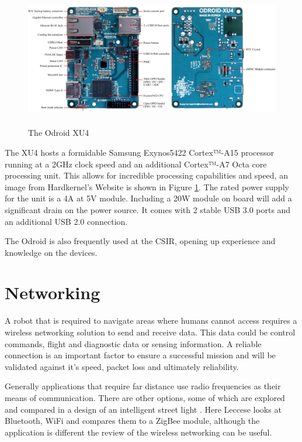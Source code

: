 			\begin{figure}[H]
				\centering
				\includegraphics[height = 6cm]{Images/System/XU4.jpg}     
				\caption{The Odroid XU4}
				\label{IM_Odroid}
			\end{figure}
			
			The XU4 hosts a formidable Samsung Exynos5422 Cortex™-A15 processor running at a 2GHz clock speed and an additional Cortex™-A7 Octa core processing unit. This allows for incredible processing capabilities and speed, an image from Hardkernel's Website is shown in Figure \ref{IM_Odroid}. The rated power supply for the unit is a 4A at 5V module. Including a 20W module on board will add a significant drain on the power source. It comes with 2 stable USB 3.0 ports and an additional USB 2.0 connection. 
			
			The Odroid is also frequently used at the CSIR, opening up experience and knowledge on the devices.
			
		\section{Networking}
		A robot that is required to navigate areas where humans cannot access requires a wireless networking solution to send and receive data. This data could be control commands, flight and diagnostic data or sensing information. A reliable connection is an important factor to ensure a successful mission and will be validated against it's speed, packet loss and ultimately reliability.
		
		Generally applications that require far distance use radio frequencies as their means of communication. There are other options, some of which are explored and compared in a design of an intelligent street light \cite{StreetLight}. Here Leccese looks at Bluetooth, WiFi and compares them to a ZigBee module, although the application is different the review of the wireless networking can be useful. 
		
